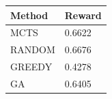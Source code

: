 \begin{tabular}{ll}
\hline
Method & Reward \\
\hline
  MCTS & 0.6622 \\
  RANDOM & 0.6676 \\
  GREEDY & 0.4278 \\
  GA & 0.6405 \\
\hline
\end{tabular}
